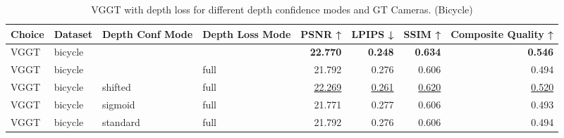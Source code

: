 \begin{table}[H]
\caption{VGGT with depth loss for different depth confidence modes and GT Cameras. (Bicycle)}
\label{tab:05_depth_conf_mode_gt_cams_bicycle}
\centering
\scriptsize
\begin{tabular}{llllrrrr}
\toprule
Choice & Dataset & Depth Conf Mode & Depth Loss Mode & PSNR ↑ & LPIPS ↓ & SSIM ↑ & Composite Quality ↑ \\
\midrule
VGGT & bicycle &  &  & \textbf{22.770} & \textbf{0.248} & \textbf{0.634} & \textbf{0.546} \\
VGGT & bicycle &  & full & 21.792 & 0.276 & 0.606 & 0.494 \\
VGGT & bicycle & shifted & full & \underline{22.269} & \underline{0.261} & \underline{0.620} & \underline{0.520} \\
VGGT & bicycle & sigmoid & full & 21.771 & 0.277 & 0.606 & 0.493 \\
VGGT & bicycle & standard & full & 21.792 & 0.276 & 0.606 & 0.494 \\
\bottomrule
\end{tabular}
\end{table}
